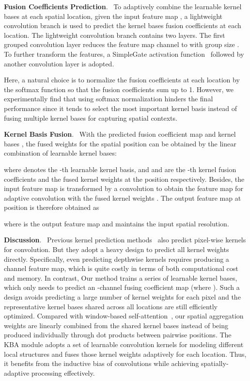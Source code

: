 \documentclass[default,iicol]{sn-jnl}
\theoremstyle{thmstyleone}\newtheorem{theorem}{Theorem}\newtheorem{proposition}[theorem]{Proposition}
\theoremstyle{thmstyletwo}\newtheorem{example}{Example}\newtheorem{remark}{Remark}
\theoremstyle{thmstylethree}\newtheorem{definition}{Definition}
\begin{document}
\noindent\textbf{Fusion Coefficients Prediction}.~
To adaptively combine the  learnable kernel bases at each spatial location, given the input feature map , a lightweight convolution branch is used to predict the  kernel bases fusion coefficients  at each location.
The lightweight convolution branch contains two layers.
The first  grouped convolution layer reduces the feature map channel to  with group size . 
To further transform the features, a SimpleGate activation function~\cite{chen2022nafnet} followed by another  convolution layer is adopted.


Here, a natural choice is to normalize the fusion coefficients at each location by the softmax function so that the fusion coefficients sum up to 1. However, we experimentally find that using softmax normalization hinders the final performance since it tends to select the most important kernel basis instead of fusing multiple kernel bases for capturing spatial contexts.


\noindent\textbf{Kernel Basis Fusion}.~
With the predicted fusion coefficient map  and kernel bases , the fused weights  for the spatial position  can be obtained by the linear combination of learnable kernel bases:

    where  denotes the -th learnable kernel basis, and  and  are the -th kernel fusion coefficients and the fused kernel weights at the position  respectively. 
Besides, the input feature map  is transformed by a  
 convolution to obtain the feature map  for adaptive convolution with the fused kernel weights .
The output feature map  at position  
is therefore obtained as

where  is the output feature map and maintains the input spatial resolution.


\noindent\textbf{Discussion}.~
Previous kernel prediction methods~\cite{kpn,mckpn,malleconv,xia2020bpn} also predict pixel-wise kernels for convolution. But they adopt a heavy design to predict all kernel weights directly.
Specifically, even predicting  depthwise kernels requires producing a  channel feature map, which is quite costly in terms of both computational cost and memory. In contrast, Our method trains a series of learnable kernel bases, which only needs to predict an -channel fusing coefficient map (where ).
Such a design avoids predicting a large number of kernel weights for each pixel and the representative kernel bases shared across all locations are still efficiently optimized.
Compared with window-based self-attention~\cite{wang2021uformer,tu2022maxim}, our spatial aggregation weights are linearly combined from the shared kernel bases instead of being produced individually through dot products between pairwise positions. 
The KBA module adopts a set of learnable convolution kernels for modeling different local structures and fuses those kernel weights adaptively for each location.
Thus, it benefits from the inductive bias of convolutions while achieving spatially-adaptive processing effectively.
\end{document}
